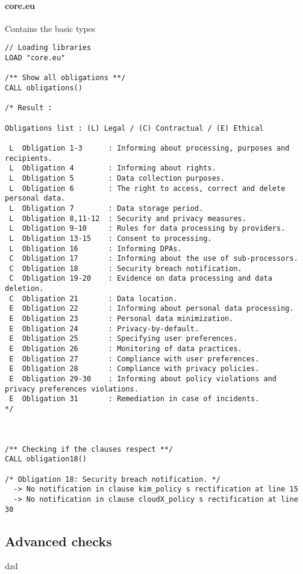 \paragraph{core.eu} Contains the basic types
\begin{lstlisting}
// Loading libraries
LOAD "core.eu"

/** Show all obligations **/
CALL obligations() 

/* Result :

Obligations list : (L) Legal / (C) Contractual / (E) Ethical 

 L  Obligation 1-3      : Informing about processing, purposes and recipients. 
 L  Obligation 4        : Informing about rights. 
 L  Obligation 5        : Data collection purposes. 
 L  Obligation 6        : The right to access, correct and delete personal data. 
 L  Obligation 7        : Data storage period. 
 L  Obligation 8,11-12  : Security and privacy measures. 
 L  Obligation 9-10     : Rules for data processing by providers. 
 L  Obligation 13-15    : Consent to processing. 
 L  Obligation 16       : Informing DPAs. 
 C  Obligation 17       : Informing about the use of sub-processors. 
 C  Obligation 18       : Security breach notification. 
 C  Obligation 19-20    : Evidence on data processing and data deletion. 
 C  Obligation 21       : Data location. 
 E  Obligation 22       : Informing about personal data processing. 
 E  Obligation 23       : Personal data minimization. 
 E  Obligation 24       : Privacy-by-default. 
 E  Obligation 25       : Specifying user preferences. 
 E  Obligation 26       : Monitoring of data practices. 
 E  Obligation 27       : Compliance with user preferences. 
 E  Obligation 28       : Compliance with privacy policies. 
 E  Obligation 29-30    : Informing about policy violations and privacy preferences violations. 
 E  Obligation 31       : Remediation in case of incidents. 
*/



/** Checking if the clauses respect **/
CALL obligation18()

/* Obligation 18: Security breach notification. */
  -> No notification in clause kim_policy s rectification at line 15
  -> No notification in clause cloudX_policy s rectification at line 30

\end{lstlisting}


\subsection{Advanced checks}
dzd



